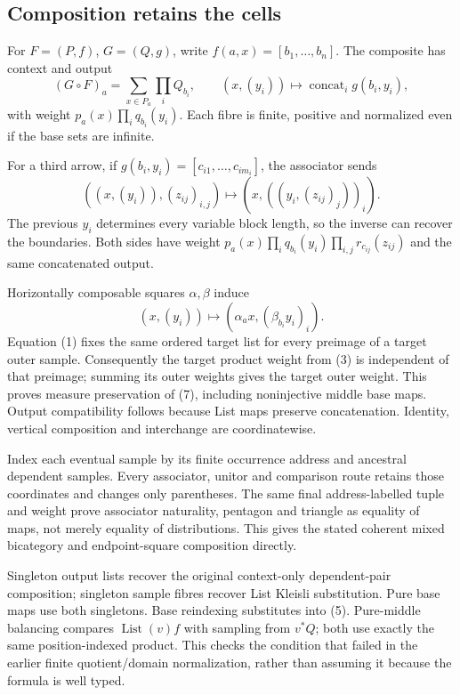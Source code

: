 \documentclass[11pt,a4paper]{article}
\newcommand{\List}{\operatorname{List}}
\begin{document}
\subsection{Composition retains the cells}

For \(F=(P,f)\), \(G=(Q,g)\), write \(f(a,x)=[b_1,\ldots,b_n]\).
The composite has context and output
\[
 (G\circ F)_a=\sum_{x\in P_a}\prod_iQ_{b_i},\qquad
 (x,(y_i))\longmapsto\operatorname{concat}_i g(b_i,y_i),       \tag{5}
\]
with weight \(p_a(x)\prod_iq_{b_i}(y_i)\). Each fibre is finite,
positive and normalized even if the base sets are infinite.

For a third arrow, if \(g(b_i,y_i)=[c_{i1},\ldots,c_{im_i}]\),
the associator sends
\[
 ((x,(y_i)),(z_{ij})_{i,j})
 \longmapsto (x,((y_i,(z_{ij})_j))_i).              \tag{6}
\]
The previous \(y_i\) determines every variable block length, so the inverse
can recover the boundaries. Both sides have weight
\(p_a(x)\prod_iq_{b_i}(y_i)\prod_{i,j}r_{c_{ij}}(z_{ij})\)
and the same concatenated output.

Horizontally composable squares \(\alpha,\beta\) induce
\[
 (x,(y_i))\longmapsto
       (\alpha_a x,(\beta_{b_i}y_i)_i).            \tag{7}
\]
Equation (1) fixes the same ordered target list for every preimage of a target
outer sample. Consequently the target product weight from (3) is independent
of that preimage; summing its outer weights gives the target outer weight.
This proves measure preservation of (7), including noninjective middle base
maps. Output compatibility follows because List maps preserve concatenation.
Identity, vertical composition and interchange are coordinatewise.

Index each eventual sample by its finite occurrence address and ancestral
dependent samples. Every associator, unitor and comparison route retains those
coordinates and changes only parentheses. The same final address-labelled
tuple and weight prove associator naturality, pentagon and triangle as equality
of maps, not merely equality of distributions. This gives the stated coherent
mixed bicategory and endpoint-square composition directly.

Singleton output lists recover the original context-only dependent-pair
composition; singleton sample fibres recover List Kleisli substitution.
Pure base maps use both singletons. Base reindexing substitutes into (5).
Pure-middle balancing compares \(\List(v)f\) with sampling from \(v^*Q\);
both use exactly the same position-indexed product. This checks the condition
that failed in the earlier finite quotient/domain normalization, rather than
assuming it because the formula is well typed.
\end{document}
